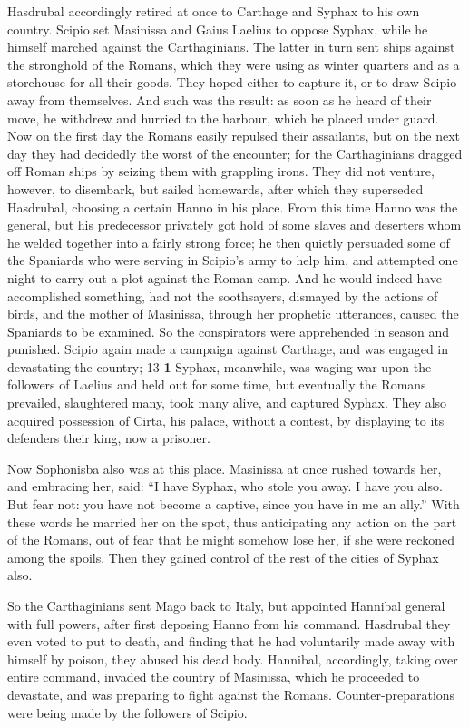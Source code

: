 Hasdrubal accordingly retired at once to Carthage and Syphax to his own country. Scipio set Masinissa and Gaius Laelius to oppose Syphax, while he himself marched against the Carthaginians. The latter in turn sent ships against the stronghold of the Romans, which they were using as winter quarters and as a storehouse for all their goods. They hoped either to capture it, or to draw Scipio away from themselves. And such was the result: as soon as he heard of their move, he withdrew and hurried to the harbour, which he placed under guard. Now on the first day the Romans easily repulsed their assailants, but on the next day they had decidedly the worst of the encounter; for the Carthaginians dragged off Roman ships by seizing them with grappling irons. They did not venture, however, to disembark, but sailed homewards, after which they superseded Hasdrubal, choosing a certain Hanno in his place. From this time Hanno was the general, but his predecessor privately got hold of some slaves and deserters whom he welded together into a fairly strong force; he then quietly persuaded some of the Spaniards who were serving in Scipio's army to help him, and attempted one night to carry out a plot against the Roman camp. And he would indeed have accomplished something, had not the soothsayers, dismayed by the actions of birds, and the mother of Masinissa, through her prophetic utterances, caused the Spaniards to be examined. So the conspirators were apprehended in season and punished. Scipio again made a campaign against Carthage, and was engaged in devastating the country;
13
\textbf{1} Syphax, meanwhile, was waging war upon the followers of Laelius and held out for some time, but eventually the Romans prevailed, slaughtered many, took many alive, and captured Syphax. They also acquired possession of Cirta, his palace, without a contest, by displaying to its defenders their king, now a prisoner.

Now Sophonisba also was at this place. Masinissa at once rushed towards her, and embra­cing her, said: ``I have Syphax, who stole you away. I have you also. But fear not: you have not become a captive, since you have in me an ally.'' With these words he married her on the spot, thus anticipating any action on the part of the Romans, out of fear that he might somehow lose her, if she were reckoned among the spoils. Then they gained control of the rest of the cities of Syphax also.

So the Carthaginians sent Mago back to Italy, but appointed Hannibal general with full powers, after first deposing Hanno from his command. Hasdrubal they even voted to put to death, and finding that he had voluntarily made away with himself by poison, they abused his dead body. Hannibal, accordingly, taking over entire command, invaded the country of Masinissa, which he proceeded to devastate, and was preparing to fight against the Romans. Counter-preparations were being made by the followers of Scipio.


